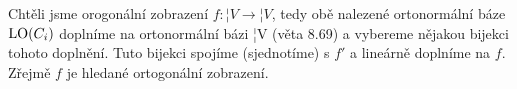\documentclass[10pt]{article}                   %
\begin{document}
\begin{priklad}[3.2*]
\begin{dukazin}
        Chtěli jsme orogonální zobrazení $f: ¦V \rightarrow ¦V$, tedy obě nalezené ortonormální báze $\operatorname{LO}(C_i)$ doplníme na ortonormální bázi ¦V (věta 8.69) a vybereme nějakou bijekci tohoto doplnění. Tuto bijekci spojíme (sjednotíme) s $f'$ a lineárně doplníme na $f$. Zřejmě $f$ je hledané ortogonální zobrazení.
    \end{dukazin}
\end{priklad}
\end{document}
